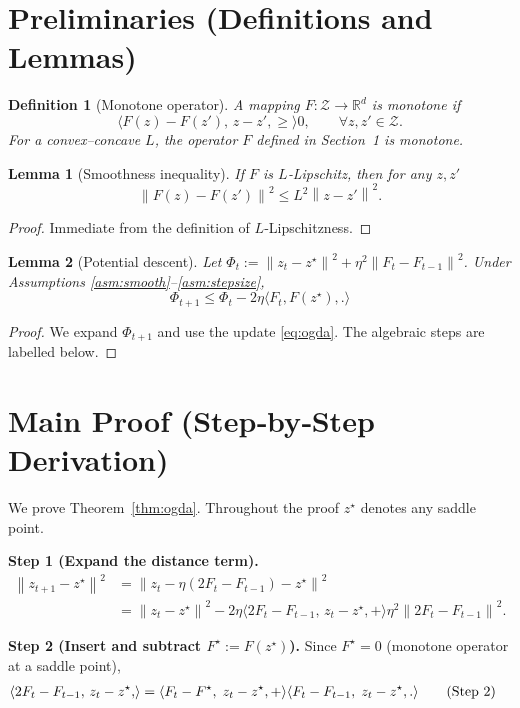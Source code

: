 \documentclass{article}
\newtheorem{lemma}{Lemma}
\newtheorem{definition}{Definition}
\newcommand{\R}{\mathbb{R}}
\newcommand{\norm}[1]{\left\|#1\right\|}
\newcommand{\ip}[2]{\langle #1,#2\rangle}
\begin{document}
\newpage
\section*{Preliminaries (Definitions and Lemmas)}

\begin{definition}[Monotone operator]
A mapping $F:\mathcal Z\to\R^{d}$ is monotone if
\[
    \ip{F(z)-F(z'),\,z-z'}\ge0,\qquad\forall z,z'\in\mathcal Z .
\]
For a convex–concave $L$, the operator $F$ defined in Section~1 is monotone.
\end{definition}

\begin{lemma}[Smoothness inequality]\label{lem:smooth}
If $F$ is $L$‑Lipschitz, then for any $z,z'$
\[
    \norm{F(z)-F(z')}^2\le L^2\norm{z-z'}^2.
\]
\end{lemma}
\begin{proof}
Immediate from the definition of $L$‑Lipschitzness. \qedhere
\end{proof}

\begin{lemma}[Potential descent]\label{lem:potential}
Let $\Phi_t:=\norm{z_t-z^\star}^2+\eta^2\norm{F_t-F_{t-1}}^2$.  Under Assumptions \ref{asm:smooth}–\ref{asm:stepsize},
\[
    \Phi_{t+1}\le \Phi_t-2\eta\ip{F_t,F(z^\star)} .
\]
\end{lemma}
\begin{proof}
We expand $\Phi_{t+1}$ and use the update \eqref{eq:ogda}.  The algebraic steps are labelled below. \qedhere
\end{proof}

\section*{Main Proof (Step‑by‑Step Derivation)}
We prove Theorem~\ref{thm:ogda}.  Throughout the proof $z^\star$ denotes any saddle point.

\bigskip
\noindent\textbf{Step 1 (Expand the distance term).}
\begin{align}
    \norm{z_{t+1}-z^\star}^2
    &=\norm{z_t-\eta(2F_t-F_{t-1})-z^\star}^2 \nonumber\\
    &=\norm{z_t-z^\star}^2-2\eta\ip{2F_t-F_{t-1},\,z_t-z^\star}
      +\eta^2\norm{2F_t-F_{t-1}}^2. \tag{Step 1}
\end{align}

\noindent\textbf{Step 2 (Insert and subtract $F^\star:=F(z^\star)$).}
Since $F^\star=0$ (monotone operator at a saddle point),
\begin{align}
    \ip{2F_t-F_{t-1},\,z_t-z^\star}
    &=\ip{F_t-F^\star,\;z_t-z^\star}
      +\ip{F_t-F_{t-1},\;z_t-z^\star}. \tag{Step 2}
\end{align}
\end{document}
